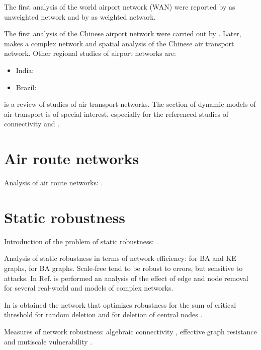 \documentclass[12pt]{article}
\begin{document}
The first analysis of the world airport network (WAN) were reported by \cite{Guimera2005, Guimera2004} as unweighted network and by \cite{Barrat2004} as weighted network.\medskip

The first analysis of the Chinese airport network were carried out by \cite{Li2004b}. Later, \cite{Lin2012a} makes a complex network and spatial analysis of the Chinese air transport network. Other regional studies of airport networks are:

\begin{itemize}
	\item India: \cite{Bagler2008}
	\item Brazil: \cite{DaRocha2009}
\end{itemize}

\cite{Zanin2013} is a review of studies of air transport networks. The section of dynamic models of air transport is of special interest, especially for the referenced studies of connectivity \cite{Burghouwt2005} and \cite{Malighetti2008}. 

\section{Air route networks}

Analysis of air route networks: \cite{Cai2012a, Sun2014, Sun2015, Du2017b}.

\section{Static robustness}

Introduction of the problem of static robustness: \cite{Albert2000}. \medskip

Analysis of static robustness in terms of network efficiency: \cite{Crucitti2003}  for BA and KE graphs, \cite{Crucitti2004b} for BA graphs. Scale-free tend to be robust to errors, but sensitive to attacks. In Ref. \cite{Holme2002a} is performed an analysis of the effect of edge and node removal for several real-world and models of complex networks. \medskip

In \cite{Paul2005} is obtained the network that optimizes robustness for the sum of critical threshold for random deletion \cite{Cohen2000a} and for deletion of central nodes \cite{Cohen2001a}. \medskip

Measures of network robustness: algebraic connectivity \cite{Fiedler1973}, effective graph resistance \cite{Ellens2011} and mutiscale vulnerability \cite{Boccaletti2007}.\medskip
\end{document}
